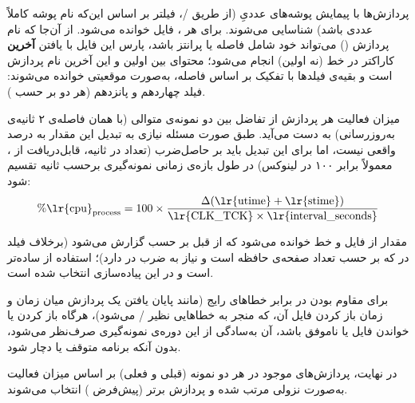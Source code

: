 پردازش‌ها با پیمایش پوشه‌های عددیِ  (از طریق /، فیلتر بر اساس این‌که نام پوشه کاملاً عددی باشد) شناسایی می‌شوند. برای هر ، فایل  خوانده می‌شود. از آن‌جا که نام پردازش () می‌تواند خود شامل فاصله یا پرانتز باشد، پارس این فایل با یافتن \textbf{آخرین} کاراکتر  در خط (نه اولین) انجام می‌شود؛ محتوای بین اولین  و این آخرین  نام پردازش است و بقیه‌ی فیلدها با تفکیک بر اساس فاصله، به‌صورت موقعیتی خوانده می‌شوند: فیلد چهاردهم  و پانزدهم  (هر دو بر حسب ).

میزان فعالیت  هر پردازش از تفاضل  بین دو نمونه‌ی متوالی (با همان فاصله‌ی ۲ ثانیه‌ی به‌روزرسانی) به دست می‌آید. طبق صورت مسئله نیازی به تبدیل این مقدار به درصد واقعی نیست، اما برای این تبدیل باید بر حاصل‌ضرب  (تعداد  در ثانیه، قابل‌دریافت از ، معمولاً برابر ۱۰۰ در لینوکس) در طول بازه‌ی زمانی نمونه‌گیری برحسب ثانیه تقسیم شود:
\[
\%\text{\lr{cpu}}_{\text{process}} = 100 \times \frac{\Delta(\text{\lr{utime}}+\text{\lr{stime}})}{\text{\lr{CLK\_TCK}} \times \text{\lr{interval\_seconds}}}
\]

مقدار  از فایل  و خط  خوانده می‌شود که از قبل بر حسب  گزارش می‌شود (برخلاف فیلد  در  که بر حسب تعداد صفحه‌ی حافظه است و نیاز به ضرب در  دارد)؛ استفاده از  ساده‌تر است و در این پیاده‌سازی انتخاب شده است.

برای مقاوم بودن در برابر خطاهای رایج  (مانند پایان یافتن یک پردازش میان زمان  و زمان باز کردن فایل آن، که منجر به خطاهایی نظیر / می‌شود)، هرگاه باز کردن یا خواندن فایل  یا  ناموفق باشد، آن  به‌سادگی از این دوره‌ی نمونه‌گیری صرف‌نظر می‌شود، بدون آنکه برنامه متوقف یا دچار  شود.

در نهایت، پردازش‌های موجود در هر دو نمونه (قبلی و فعلی) بر اساس میزان فعالیت  به‌صورت نزولی مرتب شده و  پردازش برتر (پیش‌فرض ) انتخاب می‌شوند.

\begin{latin}

\end{latin}

\begin{latin}

\end{latin}

